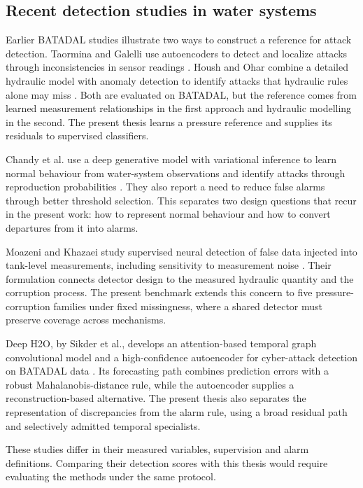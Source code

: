 \subsection{Recent detection studies in water systems}
Earlier BATADAL studies illustrate two ways to construct a reference for attack detection. Taormina and Galelli use autoencoders to detect and localize attacks through inconsistencies in sensor readings \cite{taormina2018deep}. Housh and Ohar combine a detailed hydraulic model with anomaly detection to identify attacks that hydraulic rules alone may miss \cite{housh2018model}. Both are evaluated on BATADAL, but the reference comes from learned measurement relationships in the first approach and hydraulic modelling in the second. The present thesis learns a pressure reference and supplies its residuals to supervised classifiers.

Chandy et al. use a deep generative model with variational inference to learn normal behaviour from water-system observations and identify attacks through reproduction probabilities \cite{chandy2019generative}. They also report a need to reduce false alarms through better threshold selection. This separates two design questions that recur in the present work: how to represent normal behaviour and how to convert departures from it into alarms.

Moazeni and Khazaei study supervised neural detection of false data injected into tank-level measurements, including sensitivity to measurement noise \cite{moazeni2022}. Their formulation connects detector design to the measured hydraulic quantity and the corruption process. The present benchmark extends this concern to five pressure-corruption families under fixed missingness, where a shared detector must preserve coverage across mechanisms.

Deep H2O, by Sikder et al., develops an attention-based temporal graph convolutional model and a high-confidence autoencoder for cyber-attack detection on BATADAL data \cite{deeph2o2023}. Its forecasting path combines prediction errors with a robust Mahalanobis-distance rule, while the autoencoder supplies a reconstruction-based alternative. The present thesis also separates the representation of discrepancies from the alarm rule, using a broad residual path and selectively admitted temporal specialists.

These studies differ in their measured variables, supervision and alarm definitions. Comparing their detection scores with this thesis would require evaluating the methods under the same protocol.

